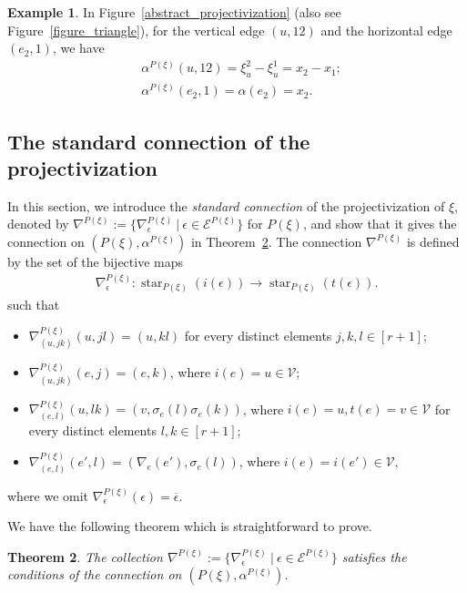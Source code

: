 \documentclass[12pt]{amsart}
\newtheorem{theorem}{Theorem}[section]
\theoremstyle{definition}
\newtheorem{example}[theorem]{Example}
\theoremstyle{remark}
\numberwithin{equation}{section}
\DeclareMathOperator{\str}{star}
\begin{document}
\begin{example}
In Figure~\ref{abstract_projectivization} (also see Figure~\ref{figure_triangle}), for the vertical edge $(u,12)$ and the horizontal edge $(e_{2},1)$, we have
\begin{align*}
& \alpha^{P(\xi)}(u,12)=\xi_{u}^{2}-\xi_{u}^{1}=x_{2}-x_{1};\\
& \alpha^{P(\xi)}(e_{2},1)=\alpha(e_{2})=x_{2}.
\end{align*}
\end{example}

\subsection{The standard connection of the projectivization}
\label{sect:3.3}

In this section, we introduce the {\it standard connection} of the projectivization of $\xi$, denoted by
$\nabla^{P(\xi)}:=\{\nabla_{\epsilon}^{P(\xi)}\ |\ \epsilon\in \mathcal{E}^{P(\xi)}\}$
for $P(\xi)$, and show that it gives the connection on $(P(\xi),\alpha^{P(\xi)})$ in  Theorem~\ref{cong_rel_for_canonical_connection}.
The connection $\nabla^{P(\xi)}$ is defined by the set of the bijective maps
\begin{align*}
\nabla_{\epsilon}^{P(\xi)}:\str_{P(\xi)}(i(\epsilon))\to \str_{P(\xi)}(t(\epsilon)).
\end{align*}
such that
\begin{itemize}
\item $\nabla_{(u,jk)}^{P(\xi)}(u,jl)=(u,kl)$ for every distinct elements $j, k, l\in [r+1]$;
\item $\nabla_{(u,jk)}^{P(\xi)}(e,j)=(e,k)$, where $i(e)=u\in \mathcal{V}$;
\item $\nabla_{(e,l)}^{P(\xi)}(u,lk)=(v,\sigma_{e}(l)\sigma_{e}(k))$, where $i(e)=u, t(e)=v\in \mathcal{V}$ for every distinct elements $l, k\in [r+1]$;
\item $\nabla_{(e,l)}^{P(\xi)}(e',l)=(\nabla_{e}(e'),\sigma_{e}(l))$, where $i(e)=i(e')\in \mathcal{V}$,
\end{itemize}
where we omit $\nabla_{\epsilon}^{P(\xi)}(\epsilon)=\overline{\epsilon}$.

We have the following theorem which is straightforward to prove.
\begin{theorem}
\label{cong_rel_for_canonical_connection}
The collection $\nabla^{P(\xi)}:=\{\nabla_{\epsilon}^{P(\xi)}\ |\ \epsilon\in \mathcal{E}^{P(\xi)}\}$ satisfies the conditions of the connection on $(P(\xi),\alpha^{P(\xi)})$.
\end{theorem}
\end{document}
